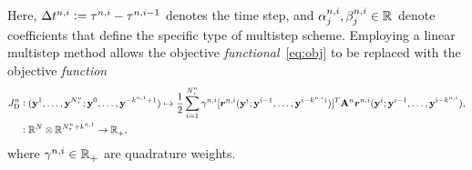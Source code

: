 Here, $\Delta t^{n,i} \vcentcolon= \tau^{n,i} - \tau^{n,i-1}$
denotes the time step, and
$\alpha^{n,i}_j,\beta^{n,i}_j\in\mathbb{R}^{}$ denote coefficients that 
define the specific type of multistep scheme. 
Employing a linear multistep method allows the objective \textit{functional}~\eqref{eq:obj} to be replaced with the objective \textit{function}
\begin{equation*}%
\begin{split} 
\objectiveArgLMS{n}_{\text{D}} &\vcentcolon (\stateyDiscreteArgnt{1},\ldots,\stateyDiscreteArgnt{\nstepsArg{n}}; \stateyDiscreteArgnt{0},\ldots,\stateyDiscreteArgnt{-\lmsWidthArg{n}{1}+1}) \mapsto 
\frac{1}{2} \sum_{i=1}^{\nstepsArg{n}} \quadWeightsLMSScalarArg{n}{i} [\residLMSWArg{n}{i}(\stateyDiscreteArgnt{i};\stateyDiscreteArgnt{i-1},\ldots, \stateyDiscreteArgnt{i-\lmsWidthArg{n}{i})})]^T  \stweightingMatArgt{n}{\timeWindowArg{n}{i}} \residLMSWArg{n}{i}(\stateyDiscreteArgnt{i};\stateyDiscreteArgnt{i-1},\ldots, \stateyDiscreteArgnt{i-\lmsWidthArg{n}{i}}), \\
&\vcentcolon \RR{\fomdim} \otimes \RR{\nstepsArg{n} + \lmsWidthArg{n}{1}} \rightarrow
\RR{}_+, 
\end{split}
\end{equation*}
where $\gamma^{n,i} \in \mathbb{R}^{}_{+}$ are quadrature weights.  

